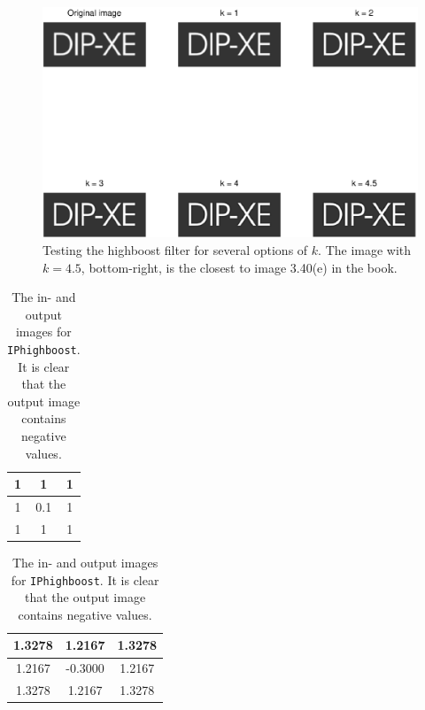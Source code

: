 \begin{figure}[h]
 \centering
 \includegraphics{dipxe.eps}
 \caption{Testing the highboost filter for several options of $k$. The image with $k = 4.5$, bottom-right, is the closest to image 3.40(e) in the book.}
 \label{fig:dipxe}
\end{figure}
\begin{table}[h]
  \begin{minipage}[b]{.5\linewidth}
    \centering
    \begin{tabular}{|c|c|c|}\hline
    1 & 1 & 1 \\ \hline
    1 & 0.1 & 1 \\ \hline
    1 & 1 & 1 \\ \hline
    \end{tabular}
    \label{tbl:inImage}
  \end{minipage}
  \hfill
  \begin{minipage}[b]{.5\linewidth}
    \centering
    \begin{tabular}{|c|c|c|}\hline
      1.3278 & 1.2167 & 1.3278 \\ \hline
      1.2167 & -0.3000 & 1.2167 \\ \hline
      1.3278 & 1.2167 & 1.3278 \\ \hline
    \end{tabular}
    \label{tbl:outImage}
  \end{minipage}
  \caption{The in- and output images for \texttt{IPhighboost}. It is clear that the output image contains negative values.}
  \hfill
\end{table}
\clearpage